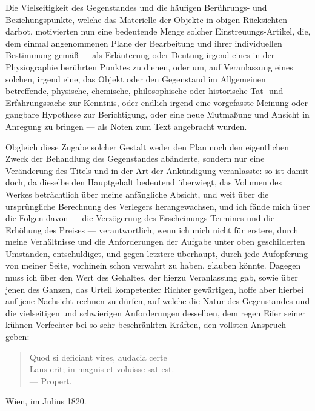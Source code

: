 \documentclass[a4paper, 11pt, oneside, german]{article}
\begin{document}
Die Vielseitigkeit des Gegenstandes und die häufigen Berührungs- und Beziehungspunkte, welche das Materielle der Objekte in obigen Rücksichten darbot, motivierten nun eine bedeutende Menge solcher Einstreuungs-Artikel, die, dem einmal angenommenen Plane der Bearbeitung und ihrer individuellen Bestimmung gemäß --- als Erläuterung oder Deutung irgend eines in der Physiographie berührten Punktes zu dienen, oder um, auf Veranlassung eines solchen, irgend eine, das Objekt oder den Gegenstand im Allgemeinen betreffende, physische, chemische, philosophische oder historische Tat- und Erfahrungssache zur Kenntnis, oder endlich irgend eine vorgefasste Meinung oder gangbare Hypothese zur Berichtigung, oder eine neue Mutmaßung und Ansicht in Anregung zu bringen --- als Noten zum Text angebracht wurden.

Obgleich diese Zugabe solcher Gestalt weder den Plan noch den eigentlichen Zweck der Behandlung des Gegenstandes abänderte, sondern nur eine Veränderung des Titels und in der Art der Ankündigung veranlasste: so ist damit doch, da dieselbe den Hauptgehalt bedeutend überwiegt, das Volumen des Werkes beträchtlich über meine anfängliche Absicht, und weit über die ursprüngliche Berechnung des Verlegers herangewachsen, und ich fände mich über die Folgen davon --- die Verzögerung des Erscheinungs-Termines und die Erhöhung des Preises --- verantwortlich, wenn ich mich nicht für erstere, durch meine Verhältnisse und die Anforderungen der Aufgabe unter oben geschilderten Umständen, entschuldiget, und gegen letztere überhaupt, durch jede Aufopferung von meiner Seite, vorhinein schon verwahrt zu haben, glauben könnte. Dagegen muss ich über den Wert des Gehaltes, der hierzu Veranlassung gab, sowie über jenen des Ganzen, das Urteil kompetenter Richter gewärtigen, hoffe aber hierbei auf jene Nachsicht rechnen zu dürfen, auf welche die Natur des Gegenstandes und die vielseitigen und schwierigen Anforderungen desselben, dem regen Eifer seiner kühnen Verfechter bei so sehr beschränkten Kräften, den vollsten Anspruch geben:

\begin{quote}
Quod si deficiant vires, audacia certe\\
Laus erit; in magnis et voluisse sat est.\\
--- Propert.
\end{quote}

Wien, im Julius 1820.
\clearpage
\end{document}
